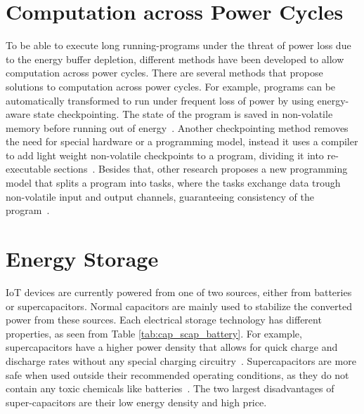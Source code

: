 \section{Computation across Power Cycles}
\label{sec:rw_comp_pc} 

To be able to execute long running-programs under the threat of power loss due to the energy buffer depletion, different methods have been developed to allow computation across power cycles.
There are several methods that propose solutions to computation across power cycles.
For example, programs can be automatically transformed to run under frequent loss of power by using energy-aware state checkpointing.
The state of the program is saved in non-volatile memory before running out of energy~\cite{ransford_asplos_2011}.
Another checkpointing method removes the need for special hardware or a programming model, instead it uses a compiler to add light weight non-volatile checkpoints to a program, dividing it into re-executable sections~\cite{vanderwoude_osdi_2016}.
Besides that, other research proposes a new programming model that splits a program into tasks, where the tasks exchange data trough non-volatile input and output channels, guaranteeing consistency of the program~\cite{colin_oopsla_2017}.


\section{Energy Storage}
\label{sec:rw_energy_storage}




IoT devices are currently powered from one of two sources, either from batteries or supercapacitors.
Normal capacitors are mainly used to stabilize the converted power from these sources.
Each electrical storage technology has different properties, as seen from Table \ref{tab:cap_scap_battery}.
For example, supercapacitors have a higher power density that allows for quick charge and discharge rates without any special charging circuitry~\cite{prasad_comst_2014}.
Supercapacitors are more safe when used outside their recommended operating conditions, as they do not contain any toxic chemicals like batteries~\cite{maxwell_overview_2017}.
The two largest disadvantages of super-capacitors are their low energy density and high price.

